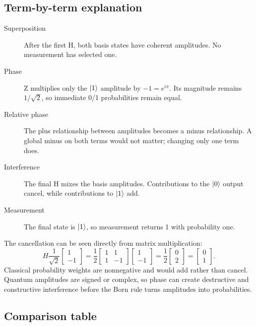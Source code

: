 \subsection{Term-by-term explanation}

\begin{description}
  \item[Superposition] After the first H, both basis states have coherent
  amplitudes. No measurement has selected one.
  \item[Phase] Z multiplies only the $\lvert 1\rangle$ amplitude by $-1=e^{i\pi}$. Its
  magnitude remains $1/\sqrt2$, so immediate 0/1 probabilities remain equal.
  \item[Relative phase] The plus relationship between amplitudes becomes a
  minus relationship. A global minus on both terms would not matter; changing
  only one term does.
  \item[Interference] The final H mixes the basis amplitudes. Contributions to
  the $\lvert 0\rangle$ output cancel, while contributions to $\lvert 1\rangle$ add.
  \item[Measurement] The final state is $\lvert 1\rangle$, so measurement returns 1 with
  probability one.
\end{description}

The cancellation can be seen directly from matrix multiplication:
\[
H\frac1{\sqrt2}
\begin{bmatrix}1\\-1\end{bmatrix}
=
\frac12
\begin{bmatrix}1&1\\1&-1\end{bmatrix}
\begin{bmatrix}1\\-1\end{bmatrix}
=
\frac12\begin{bmatrix}0\\2\end{bmatrix}
=\begin{bmatrix}0\\1\end{bmatrix}.
\]
Classical probability weights are nonnegative and would add rather than cancel.
Quantum amplitudes are signed or complex, so phase can create destructive and
constructive interference before the Born rule turns amplitudes into
probabilities.

\subsection{Comparison table}

